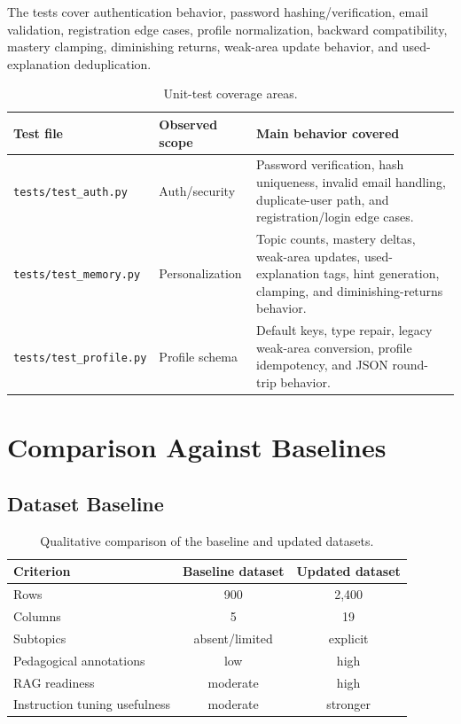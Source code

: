 \documentclass[11pt,a4paper]{article}
\begin{document}
The tests cover authentication behavior, password hashing/verification, email validation, registration edge cases, profile normalization, backward compatibility, mastery clamping, diminishing returns, weak-area update behavior, and used-explanation deduplication.


\begin{table}[H]
\centering
\footnotesize
\begin{tabularx}{\textwidth}{>{\ttfamily\raggedright\arraybackslash\footnotesize}p{}Y Y}
\toprule
\textbf{Test file} & \textbf{Observed scope} & \textbf{Main behavior covered} \\
\midrule
\texttt{tests/test\_auth.py} & Auth/security & Password verification, hash uniqueness, invalid email handling, duplicate-user path, and registration/login edge cases. \\
\texttt{tests/test\_memory.py} & Personalization & Topic counts, mastery deltas, weak-area updates, used-explanation tags, hint generation, clamping, and diminishing-returns behavior. \\
\texttt{tests/test\_profile.py} & Profile schema & Default keys, type repair, legacy weak-area conversion, profile idempotency, and JSON round-trip behavior. \\
\bottomrule
\end{tabularx}
\caption{Unit-test coverage areas.}
\label{tab:unit-tests}
\end{table}

\section{Comparison Against Baselines}

\subsection{Dataset Baseline}

\begin{table}[H]
\centering
\begin{tabular}{lcc}
\toprule
\textbf{Criterion} & \textbf{Baseline dataset} & \textbf{Updated dataset} \\
\midrule
Rows & 900 & 2,400 \\
Columns & 5 & 19 \\
Subtopics & absent/limited & explicit \\
Pedagogical annotations & low & high \\
RAG readiness & moderate & high \\
Instruction tuning usefulness & moderate & stronger \\
\bottomrule
\end{tabular}
\caption{Qualitative comparison of the baseline and updated datasets.}
\end{table}
\end{document}
